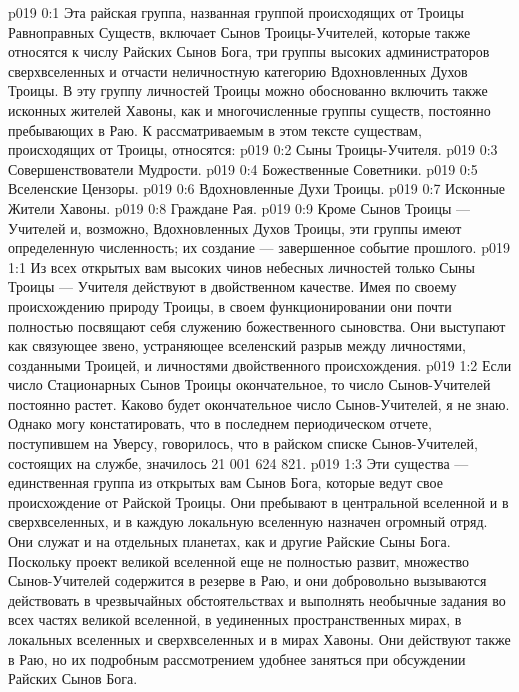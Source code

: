 \author{Божественный Советник}
\vs p019 0:1 Эта райская группа, названная группой происходящих от Троицы Равноправных Существ, включает Сынов Троицы\hyp{}Учителей, которые также относятся к числу Райских Сынов Бога, три группы высоких администраторов сверхвселенных и отчасти неличностную категорию Вдохновленных Духов Троицы. В эту группу личностей Троицы можно обоснованно включить также исконных жителей Хавоны, как и многочисленные группы существ, постоянно пребывающих в Раю. К рассматриваемым в этом тексте существам, происходящих от Троицы, относятся:
\vs p019 0:2 \bibnobreakspace Сыны Троицы\hyp{}Учителя.
\vs p019 0:3 \bibnobreakspace Совершенствователи Мудрости.
\vs p019 0:4 \bibnobreakspace Божественные Советники.
\vs p019 0:5 \bibnobreakspace Вселенские Цензоры.
\vs p019 0:6 \bibnobreakspace Вдохновленные Духи Троицы.
\vs p019 0:7 \bibnobreakspace Исконные Жители Хавоны.
\vs p019 0:8 \bibnobreakspace Граждане Рая.
\vs p019 0:9 \pc Кроме Сынов Троицы --- Учителей и, возможно, Вдохновленных Духов Троицы, эти группы имеют определенную численность; их создание --- завершенное событие прошлого.
\vs p019 1:1 Из всех открытых вам высоких чинов небесных личностей только Сыны Троицы --- Учителя действуют в двойственном качестве. Имея по своему происхождению природу Троицы, в своем функционировании они почти полностью посвящают себя служению божественного сыновства. Они выступают как связующее звено, устраняющее вселенский разрыв между личностями, созданными Троицей, и личностями двойственного происхождения.
\vs p019 1:2 Если число Стационарных Сынов Троицы окончательное, то число Сынов\hyp{}Учителей постоянно растет. Каково будет окончательное число Сынов\hyp{}Учителей, я не знаю. Однако могу констатировать, что в последнем периодическом отчете, поступившем на Уверсу, говорилось, что в райском списке Сынов\hyp{}Учителей, состоящих на службе, значилось 21 001 624 821.
\vs p019 1:3 Эти существа --- единственная группа из открытых вам Сынов Бога, которые ведут свое происхождение от Райской Троицы. Они пребывают в центральной вселенной и в сверхвселенных, и в каждую локальную вселенную назначен огромный отряд. Они служат и на отдельных планетах, как и другие Райские Сыны Бога. Поскольку проект великой вселенной еще не полностью развит, множество Сынов\hyp{}Учителей содержится в резерве в Раю, и они добровольно вызываются действовать в чрезвычайных обстоятельствах и выполнять необычные задания во всех частях великой вселенной, в уединенных пространственных мирах, в локальных вселенных и сверхвселенных и в мирах Хавоны. Они действуют также в Раю, но их подробным рассмотрением удобнее заняться при обсуждении Райских Сынов Бога.
